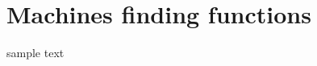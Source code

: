 \documentclass[book.tex]{subfiles}
\begin{document}
\chapter{Machines finding functions}
sample text
\end{document}
